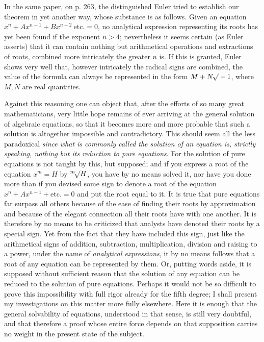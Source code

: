 In the same paper, on p. 263, the distinguished Euler tried to establish our theorem in yet another way, whose substance is as follows. Given an equation $x^n+Ax^{n-1}+Bx^{n-2}\ \text{etc.}=0$, no analytical expression representing its roots has yet been found if the exponent $n>4$; nevertheless it seems certain (as Euler asserts) that it can contain nothing but arithmetical operations and extractions of roots, combined more intricately the greater $n$ is. If this is granted, Euler shows very well that, however intricately the radical signs are combined, the value of the formula can always be represented in the form $M+N\BareRoot{-1}$, where $M,N$ are real quantities.

Against this reasoning one can object that, after the efforts of so many great mathematicians, very little hope remains of ever arriving at the general solution of algebraic equations, so that it becomes more and more probable that such a solution is altogether impossible and contradictory. This should seem all the less paradoxical \textit{since what is commonly called the solution of an equation is, strictly speaking, nothing but its reduction to pure equations}. For the solution of pure equations is not taught by this, but supposed; and if you express a root of the equation $x^m=H$ by $\BareRoot[m]{H}$, you have by no means solved it, nor have you done more than if you devised some sign to denote a root of the equation $x^n+Ax^{n-1}+\text{etc.}=0$ and put the root equal to it. It is true that pure equations far surpass all others because of the ease of finding their roots by approximation and because of the elegant connection all their roots have with one another. It is therefore by no means to be criticized that analysts have denoted their roots by a special sign. Yet from the fact that they have included this sign, just like the arithmetical signs of addition, subtraction, multiplication, division and raising to a power, under the name of \textit{analytical expressions}, it by no means follows that a root of any equation can be represented by them. Or, putting words aside, it is supposed without sufficient reason that the solution of any equation can be reduced to the solution of pure equations. Perhaps it would not be so difficult to prove this impossibility with full rigor already for the fifth degree; I shall present my investigations on this matter more fully elsewhere.
Here it is enough that the general solvability of equations, understood in that sense, is still very doubtful, and that therefore a proof whose entire force depends on that supposition carries no weight in the present state of the subject.
